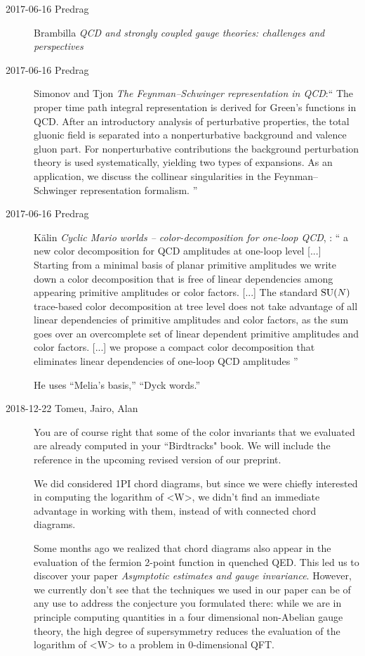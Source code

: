 \begin{description}
\item[2017-06-16 Predrag]
Brambilla \etal{}
{\em {QCD} and strongly coupled gauge theories: challenges and perspectives}

\item[2017-06-16 Predrag]
Simonov and Tjon
{\em The {Feynman–Schwinger} representation in {QCD}}:``
The proper time path integral representation is derived for Green's
functions in QCD. After an introductory analysis of perturbative
properties, the total gluonic field is separated into a nonperturbative
background and valence gluon part. For nonperturbative contributions the
background perturbation theory is used systematically, yielding two types
of expansions. As an application, we discuss the collinear singularities
in the Feynman–Schwinger representation formalism.
''

\item[2017-06-16 Predrag]
K{\"a}lin
{\em Cyclic {Mario} worlds -- color-decomposition for one-loop {QCD}},
: ``
a new color decomposition for QCD amplitudes at one-loop level [...] Starting
from a minimal basis of planar primitive amplitudes we write down a color
decomposition that is free of linear dependencies among appearing primitive
amplitudes or color factors. [...] The  standard  $\textrm{SU}(N)$ trace-based  color
decomposition at  tree  level  does  not take advantage of all linear
dependencies of primitive amplitudes and color factors, as the sum  goes  over
an  overcomplete  set  of  linear  dependent  primitive  amplitudes  and  color
factors. [...] we  propose  a  compact  color  decomposition that eliminates
linear dependencies of one-loop QCD amplitudes
''

He uses ``Melia's basis,'' ``Dyck words.''

\item[2018-12-22 Tomeu, Jairo, Alan] %
You are of course right that some of the color invariants that we
evaluated are already computed in your ``Birdtracks" book. We will include
the reference in the upcoming revised version of our preprint.

We did considered 1PI chord diagrams, but since we were chiefly
interested in computing the logarithm of <W>, we didn't find an immediate
advantage in working with them, instead of with connected chord diagrams.

Some months ago we realized that chord diagrams also appear in the
evaluation of the fermion 2-point function in quenched QED. This led us
to discover your paper {\em Asymptotic estimates and gauge
invariance}. However, we currently don't see that the techniques we used
in our paper can be of any use to address the conjecture you formulated
there: while we are in principle computing quantities in a four
dimensional non-Abelian gauge theory, the high degree of supersymmetry
reduces the evaluation of the logarithm of <W> to a problem in
0-dimensional QFT.


\end{description}
